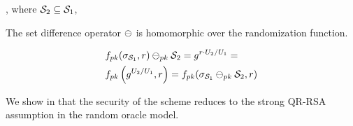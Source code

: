 , where $\genericSetVar[2] \subseteq \genericSetVar[1]$, 


\item {} The set difference operator $\sigMinus$ is homomorphic over the randomization function.    


\begin{align*} 
& \randomizeFn[\pubKey](\genericSig[\genericSetVar[1]], \genericRand) 
\sigMinus[\pubKey] \genericSetVar[2] = \qrGen^{\genericRand \fieldMult \accSet[2]/\accSet[1]}  = \\
&\randomizeFn[\pubKey]\left(\qrGen^{\accSet[2]/\accSet[1]}, \genericRand\right) = \randomizeFn[\pubKey](\genericSig[\genericSetVar[1]] \sigMinus[\pubKey] \genericSetVar[2], \genericRand)
\end{align*}

\itemListEnd


We show in  that the security of the scheme reduces to the 
strong QR-RSA assumption in the random oracle model. 



%

